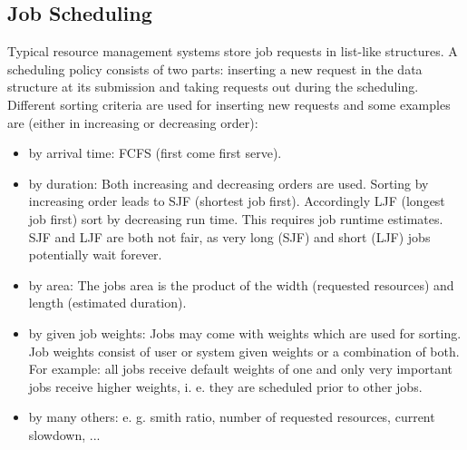 \subsection{Job Scheduling}
Typical resource management systems store job requests in list-like structures. A scheduling policy consists of two parts: inserting a new request in the data structure at its submission and taking requests out during the scheduling. Different sorting criteria are used for inserting new requests and some examples are (either in increasing or decreasing order):
\begin{itemize}
\item by arrival time: FCFS (first come first serve). 
\item by duration: Both increasing and decreasing orders are used. Sorting by increasing order leads to SJF (shortest job first). Accordingly LJF (longest job first) sort by decreasing run time. This requires job runtime estimates. SJF and LJF are both not fair, as very long (SJF) and short (LJF) jobs potentially wait forever.
\item by area: The jobs area is the product of the width (requested resources) and length (estimated duration). 
\item by given job weights: Jobs may come with weights which are used for sorting. Job weights consist of user or system given weights or a combination of both. For example: all jobs receive default weights of one and only very important jobs receive higher weights, i. e. they are scheduled prior to other jobs.
\item by many others: e. g. smith ratio, number of requested resources, current slowdown, ...
\end{itemize}

